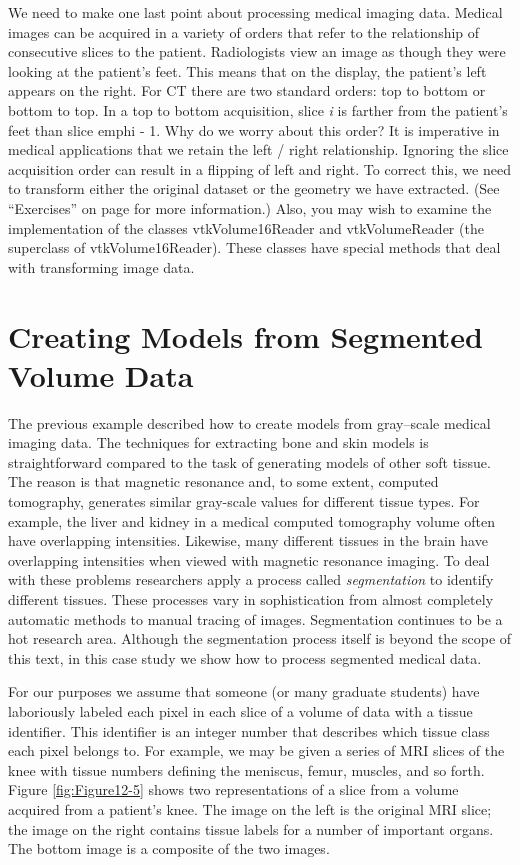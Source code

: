 We need to make one last point about processing medical imaging data. Medical images can be acquired in a variety of orders that refer to the relationship of consecutive slices to the patient. Radiologists view an image as though they were looking at the patient's feet. This means that on the display, the patient's left appears on the right. For CT there are two standard orders: top to bottom or bottom to top. In a top to bottom acquisition, slice \emph{i} is farther from the patient's feet than slice emph{i} - 1. Why do we worry about this order? It is imperative in medical applications that we retain the left / right relationship. Ignoring the slice acquisition order can result in a flipping of left and right. To correct this, we need to transform either the original dataset or the geometry we have extracted. (See ``Exercises'' on page \pageref{exercises:ch_12} for more information.) Also, you may wish to examine the implementation of the classes vtkVolume16Reader and vtkVolumeReader (the superclass of vtkVolume16Reader). These classes have special methods that deal with transforming image data.

\section{Creating Models from Segmented Volume Data}

The previous example described how to create models from gray--scale medical imaging data. The techniques for extracting bone and skin models is straightforward compared to the task of generating models of other soft tissue. The reason is that magnetic resonance and, to some extent, computed tomography, generates similar gray-scale values for different tissue types. For example, the liver and kidney in a medical computed tomography volume often have overlapping intensities. Likewise, many different tissues in the brain have overlapping intensities when viewed with magnetic resonance imaging. To deal with these problems researchers apply a process called \emph{segmentation} to identify different tissues. These processes vary in sophistication from almost completely automatic methods to manual tracing of images. Segmentation continues to be a hot research area. Although the segmentation process itself is beyond the scope of this text, in this case study we show how to process segmented medical data.

For our purposes we assume that someone (or many graduate students) have laboriously labeled each pixel in each slice of a volume of data with a tissue identifier. This identifier is an integer number that describes which tissue class each pixel belongs to. For example, we may be given a series of MRI slices of the knee with tissue numbers defining the meniscus, femur, muscles, and so forth. Figure \ref{fig:Figure12-5} shows two representations of a slice from a volume acquired from a patient's knee. The image on the left is the original MRI slice; the image on the right contains tissue labels for a number of important organs. The bottom image is a composite of the two images.

